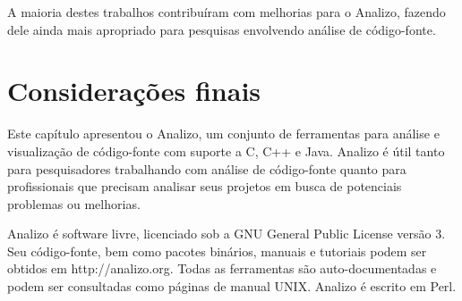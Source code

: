 A maioria destes trabalhos contribuíram com melhorias para o Analizo, fazendo
dele ainda mais apropriado para pesquisas envolvendo análise de código-fonte.

\section{Considerações finais}

Este capítulo apresentou o Analizo, um conjunto de ferramentas para análise e
visualização de código-fonte com suporte a C, C++ e Java. Analizo é útil tanto
para pesquisadores trabalhando com análise de código-fonte quanto para
profissionais que precisam analisar seus projetos em busca de
potenciais problemas ou melhorias.

Analizo é software livre, licenciado sob a GNU General Public License versão 3.
Seu código-fonte, bem como pacotes binários, manuais e tutoriais podem ser
obtidos em http://analizo.org. Todas as ferramentas são auto-documentadas e
podem ser consultadas como páginas de manual UNIX. Analizo é escrito em Perl.
